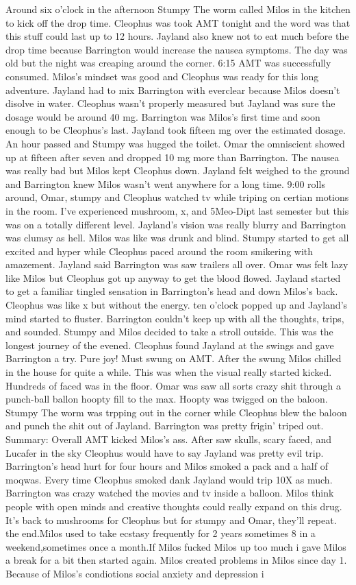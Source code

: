 \documentclass[12pt]{book}
\begin{document}
Around six o'clock in the afternoon Stumpy The worm called Milos in the kitchen to kick off the drop time. Cleophus was took AMT tonight and the word was that this stuff could last up to 12 hours. Jayland also knew not to eat much before the drop time because Barrington would increase the nausea symptoms. The day was old but the night was creaping around the corner. 6:15 AMT was successfully consumed. Milos's mindset was good and Cleophus was ready for this long adventure. Jayland had to mix Barrington with everclear because Milos doesn't disolve in water. Cleophus wasn't properly measured but Jayland was sure the dosage would be around 40 mg. Barrington was Milos's first time and soon enough to be Cleophus's last. Jayland took fifteen mg over the estimated dosage. An hour passed and Stumpy was hugged the toilet. Omar the omniscient showed up at fifteen after seven and dropped 10 mg more than Barrington. The nausea was really bad but Milos kept Cleophus down. Jayland felt weighed to the ground and Barrington knew Milos wasn't went anywhere for a long time. 9:00 rolls around, Omar, stumpy and Cleophus watched tv while triping on certian motions in the room. I've experienced mushroom, x, and 5Meo-Dipt last semester but this was on a totally different level. Jayland's vision was really blurry and Barrington was clumsy as hell. Milos was like was drunk and blind. Stumpy started to get all excited and hyper while Cleophus paced around the room smikering with amazement. Jayland said Barrington was saw trailers all over. Omar was felt lazy like Milos but Cleophus got up anyway to get the blood flowed. Jayland started to get a familiar tingled sensation in Barrington's head and down Milos's back. Cleophus was like x but without the energy. ten o'clock popped up and Jayland's mind started to fluster. Barrington couldn't keep up with all the thoughts, trips, and sounded. Stumpy and Milos decided to take a stroll outside. This was the longest journey of the evened. Cleophus found Jayland at the swings and gave Barrington a try. Pure joy! Must swung on AMT. After the swung Milos chilled in the house for quite a while. This was when the visual really started kicked. Hundreds of faced was in the floor. Omar was saw all sorts crazy shit through a punch-ball ballon hoopty fill to the max. Hoopty was twigged on the baloon. Stumpy The worm was trpping out in the corner while Cleophus blew the baloon and punch the shit out of Jayland. Barrington was pretty frigin' triped out. Summary: Overall AMT kicked Milos's ass. After saw skulls, scary faced, and Lucafer in the sky Cleophus would have to say Jayland was pretty evil trip. Barrington's head hurt for four hours and Milos smoked a pack and a half of moqwas. Every time Cleophus smoked dank Jayland would trip 10X as much. Barrington was crazy watched the movies and tv inside a balloon. Milos think people with open minds and creative thoughts could really expand on this drug. It's back to mushrooms for Cleophus but for stumpy and Omar, they'll repeat. the end.Milos used to take ecstasy frequently for 2 years sometimes 8 in a weekend,sometimes once a month.If Milos fucked Milos up too much i gave Milos a break for a bit then started again. Milos created problems in Milos since day 1. Because of Milos's condiotions social anxiety and depression i 
\end{document}
